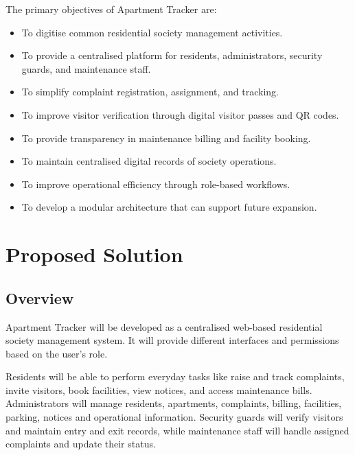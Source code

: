 \documentclass[11pt,a4paper]{article}
\begin{document}
The primary objectives of Apartment Tracker are:

\begin{itemize}

    \item To digitise common residential society management activities.

    \item To provide a centralised platform for residents, administrators, security guards, and maintenance staff.

    \item To simplify complaint registration, assignment, and tracking.

    \item To improve visitor verification through digital visitor passes and QR codes.

    \item To provide transparency in maintenance billing and facility booking.

    \item To maintain centralised digital records of society operations.

    \item To improve operational efficiency through role-based workflows.

    \item To develop a modular architecture that can support future expansion.

\end{itemize}


\section{Proposed Solution}

\subsection{Overview}

Apartment Tracker will be developed as a centralised web-based residential society management system. It will provide different interfaces and permissions based on the user's role.

Residents will be able to perform everyday tasks like raise and track complaints, invite visitors, book facilities, view notices, and access maintenance bills. Administrators will manage residents, apartments, complaints, billing, facilities, parking, notices and operational information. Security guards will verify visitors and maintain entry and exit records, while maintenance staff will handle assigned complaints and update their status.
\end{document}
